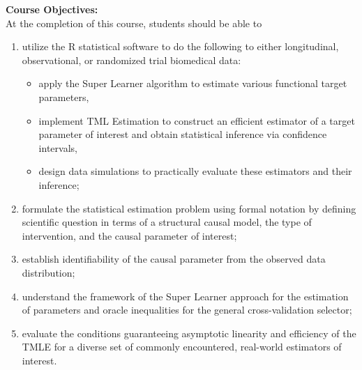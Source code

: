 \documentclass[11pt]{article}
\begin{document}
\textbf {\large Course Objectives:} \\
At the completion of this course, students should be able to
\begin{enumerate} \itemsep-0.4em
  \item utilize the R statistical software to do the following to either
    longitudinal, observational, or randomized trial biomedical data:
    \begin{itemize}
      \item apply the Super Learner algorithm to estimate various functional
        target parameters,
      \item implement TML Estimation to construct an efficient estimator of a
        target parameter of interest and obtain statistical inference via
        confidence intervals,
      \item design data simulations to practically evaluate these estimators and
        their inference;
    \end{itemize}
  \item formulate the statistical estimation problem using formal notation by
    defining scientific question in terms of a structural causal model, the type
    of intervention, and the causal parameter of interest;
  \item establish identifiability of the causal parameter from the observed data
    distribution;
  \item understand the framework of the Super Learner approach for the
    estimation of parameters and oracle inequalities for the general
    cross-validation selector;
  \item evaluate the conditions guaranteeing asymptotic linearity and efficiency
    of the TMLE for a diverse set of commonly encountered, real-world estimators
    of interest. \\
\end{enumerate}

\newpage
\end{document}
